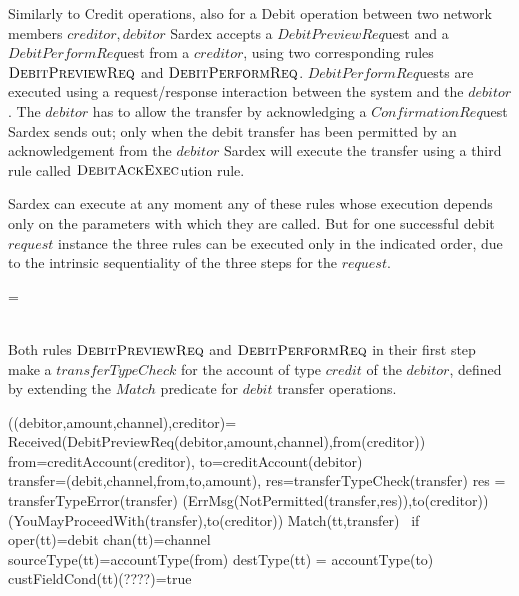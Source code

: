 Similarly to Credit operations, also for a Debit operation between two network members $creditor,debitor$ Sardex accepts a $DebitPreviewReq$uest and a  $DebitPerformReq$uest from a $creditor$, using two corresponding rules $\hbox{\sc DebitPreviewReq}$ and $\hbox{\sc DebitPerformReq}$.  $DebitPerformReq$uests are executed using a request/response interaction between the system and the $debitor$. The $debitor$ has to allow the transfer by acknowledging a $ConfirmationReq$uest Sardex sends out; only when the debit transfer has been permitted by an acknowledgement from the $debitor$ Sardex will execute the transfer using a third rule called $\hbox{\sc DebitAckExec}$ution rule. 

Sardex can execute at any moment any of these rules whose execution depends only on the parameters with which they are called. But for one successful debit $request$ instance the three rules can be executed only in the indicated order, due to the intrinsic sequentiality of the three steps for the $request$.

\begin{asm}
=\+
    \\
    \\
\end{asm}


Both rules $\hbox{\sc DebitPreviewReq}$ and $\hbox{\sc DebitPerformReq}$ in their first step make a $transferTypeCheck$ for the account of type $credit$ of the $debitor$, defined by extending the $Match$ predicate for $debit$ transfer operations. 

\begin{asm}
((debitor,amount,channel),creditor)=\+
  \IF Received(DebitPreviewReq(debitor,amount,channel),from(creditor)) \THEN \+  
    \LET from=creditAccount(creditor), to=creditAccount(debitor)\\
    \LET transfer=(debit,channel,from,to,amount), res=transferTypeCheck(transfer) \+
        \IF res = transferTypeError(transfer) \THEN \+                       (ErrMsg(NotPermitted(transfer,res)),to(creditor))\-
        \ELSE~ (YouMayProceedWith(transfer),to(creditor))\dec\-
\WHERE \+
  Match(tt,transfer) \mbox{ if } \+
        oper(tt)=debit \AND chan(tt)=channel \AND \\
        sourceType(tt)=accountType(from) \AND destType(tt) =  accountType(to) \AND \\ custFieldCond(tt)(????)=true
\end{asm}

